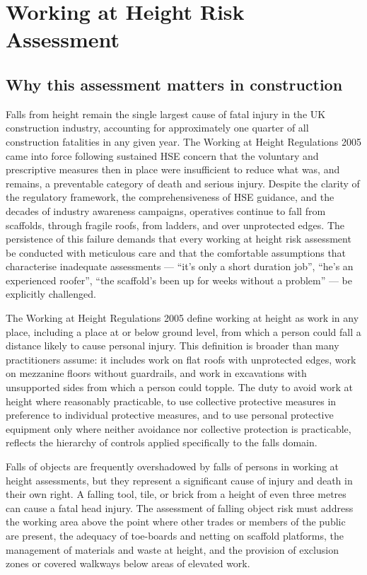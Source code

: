 \chapter{Working at Height Risk Assessment}
\label{chap:Working at Height Risk Assessment}

\section{Why this assessment matters in construction}

Falls from height remain the single largest cause of fatal injury in the UK construction industry, accounting for approximately one quarter of all construction fatalities in any given year. The Working at Height Regulations 2005 came into force following sustained HSE concern that the voluntary and prescriptive measures then in place were insufficient to reduce what was, and remains, a preventable category of death and serious injury. Despite the clarity of the regulatory framework, the comprehensiveness of HSE guidance, and the decades of industry awareness campaigns, operatives continue to fall from scaffolds, through fragile roofs, from ladders, and over unprotected edges. The persistence of this failure demands that every working at height risk assessment be conducted with meticulous care and that the comfortable assumptions that characterise inadequate assessments --- ``it's only a short duration job'', ``he's an experienced roofer'', ``the scaffold's been up for weeks without a problem'' --- be explicitly challenged.

The Working at Height Regulations 2005 define working at height as work in any place, including a place at or below ground level, from which a person could fall a distance likely to cause personal injury. This definition is broader than many practitioners assume: it includes work on flat roofs with unprotected edges, work on mezzanine floors without guardrails, and work in excavations with unsupported sides from which a person could topple. The duty to avoid work at height where reasonably practicable, to use collective protective measures in preference to individual protective measures, and to use personal protective equipment only where neither avoidance nor collective protection is practicable, reflects the hierarchy of controls applied specifically to the falls domain.

Falls of objects are frequently overshadowed by falls of persons in working at height assessments, but they represent a significant cause of injury and death in their own right. A falling tool, tile, or brick from a height of even three metres can cause a fatal head injury. The assessment of falling object risk must address the working area above the point where other trades or members of the public are present, the adequacy of toe-boards and netting on scaffold platforms, the management of materials and waste at height, and the provision of exclusion zones or covered walkways below areas of elevated work.

